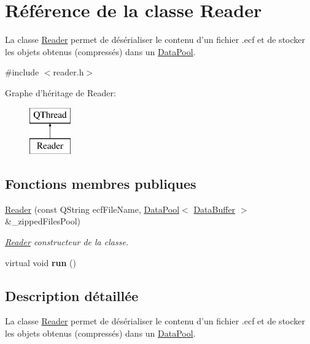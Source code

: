 \hypertarget{class_reader}{\section{Référence de la classe Reader}
\label{class_reader}
}


La classe \hyperlink{class_reader}{Reader} permet de désérialiser le contenu d'un fichier .ecf et de stocker les objets obtenus (compressés) dans un \hyperlink{class_data_pool}{Data\+Pool}.  




{\ttfamily \#include $<$reader.\+h$>$}

Graphe d'héritage de Reader\+:\begin{figure}[H]
\begin{center}
\leavevmode
\includegraphics[height=2.000000cm]{class_reader}
\end{center}
\end{figure}
\subsection*{Fonctions membres publiques}
\begin{DoxyCompactItemize}
\item 
\hyperlink{class_reader_a85ffbb6feed009ea992370b829c1d4c5}{Reader} (const Q\+String ecf\+File\+Name, \hyperlink{class_data_pool}{Data\+Pool}$<$ \hyperlink{class_data_buffer}{Data\+Buffer} $>$ \&\+\_\+zipped\+Files\+Pool)
\begin{DoxyCompactList}\small\item\em \hyperlink{class_reader}{Reader} constructeur de la classe. \end{DoxyCompactList}\item 
\hypertarget{class_reader_aac4ef17c2ee8e7a45820dc23a7f92d3e}{virtual void {\bfseries run} ()}\label{class_reader_aac4ef17c2ee8e7a45820dc23a7f92d3e}

\end{DoxyCompactItemize}


\subsection{Description détaillée}
La classe \hyperlink{class_reader}{Reader} permet de désérialiser le contenu d'un fichier .ecf et de stocker les objets obtenus (compressés) dans un \hyperlink{class_data_pool}{Data\+Pool}. 

